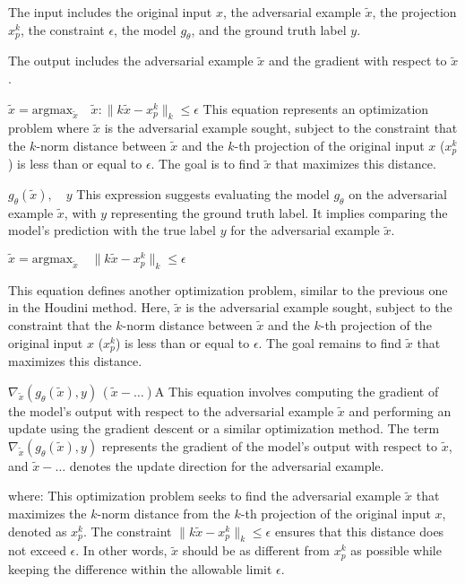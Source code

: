 The input includes the original input $x$, the adversarial example $\tilde{x}$, the projection $x^k_p$, the constraint $\epsilon$, the model $g_{\theta}$, and the ground truth label $y$.

The output includes the adversarial example $\tilde{x}$ and the gradient with respect to $\tilde{x}$.

$\tilde{x} = \text{argmax}_{\tilde{x}} \quad \tilde{x} : \| k\tilde{x} - x^k_p \|_k \leq \epsilon$
This equation represents an optimization problem where $\tilde{x}$ is the adversarial example sought, subject to the constraint that the $k$-norm distance between $\tilde{x}$ and the $k$-th projection of the original input $x$ ($x^k_p$) is less than or equal to $\epsilon$. The goal is to find $\tilde{x}$ that maximizes this distance.

$g_{\theta}(\tilde{x}), \quad y$
This expression suggests evaluating the model $g_{\theta}$ on the adversarial example $\tilde{x}$, with $y$ representing the ground truth label. It implies comparing the model's prediction with the true label $y$ for the adversarial example $\tilde{x}$.

$\tilde{x} = \text{argmax}_{\tilde{x}} \quad \| k\tilde{x} - x^k_p \|_k \leq \epsilon$

This equation defines another optimization problem, similar to the previous one in the Houdini method. Here, $\tilde{x}$ is the adversarial example sought, subject to the constraint that the $k$-norm distance between $\tilde{x}$ and the $k$-th projection of the original input $x$ ($x^k_p$) is less than or equal to $\epsilon$. The goal remains to find $\tilde{x}$ that maximizes this distance.


$\nabla_{\tilde{x}}(g_{\theta}(\tilde{x}), y) \, (\tilde{x} - \ldots)$A
This equation involves computing the gradient of the model's output with respect to the adversarial example $\tilde{x}$ and performing an update using the gradient descent or a similar optimization method. The term $\nabla_{\tilde{x}}(g_{\theta}(\tilde{x}), y)$ represents the gradient of the model's output with respect to $\tilde{x}$, and $\tilde{x} - \ldots$ denotes the update direction for the adversarial example.

where:
This optimization problem seeks to find the adversarial example $\tilde{x}$ that maximizes the $k$-norm distance from the $k$-th projection of the original input $x$, denoted as $x^k_p$. The constraint $\| k\tilde{x} - x^k_p \|_k \leq \epsilon$ ensures that this distance does not exceed $\epsilon$. In other words, $\tilde{x}$ should be as different from $x^k_p$ as possible while keeping the difference within the allowable limit $\epsilon$.

